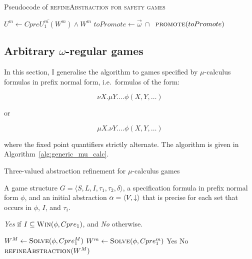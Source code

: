 \begin{algorithm}

\caption{Pseudocode of \textsc{refineAbstraction for safety games}}
\label{alg:refineAbstractionSafe}

\begin{algorithmic}[1]
\State $U^m \gets \overline{CpreU_1^{m}(W^m)} \land W^m$
    \State $toPromote \gets \vec{\omega}~\cap~$
    \State $\Call{promote}{toPromote}$
\EndFunction
\end{algorithmic}
\end{algorithm}

\subsection{Arbitrary $\omega$-regular games}
\label{sec:omega_reg}

In this section, I generalise the algorithm to games specified by $\mu$-calculus formulas in prefix normal form, i.e.\ formulas of the form:

\begin{equation}
\nu X. \mu Y. \ldots \phi(X, Y, \ldots)
\end{equation}

or

\begin{equation}
\mu X. \nu Y. \ldots \phi(X, Y, \ldots)
\end{equation}

\noindent where the fixed point quantifiers strictly alternate. The algorithm is given in Algorithm~\ref{alg:generic_mu_calc}.

\begin{algorithm}
\caption{Three-valued abstraction refinement for $\mu$-calculus games}
\label{alg:generic_mu_calc}

\begin{algorithmic}[1]

 A game structure $G = \langle S, L, I, \tau_1, \tau_2, \delta \rangle$, a specification formula in prefix normal form $\phi$, and an initial abstraction $\alpha=\langle V, \mathord{\downarrow} \rangle$ that is precise for each set that occurs in $\phi$, $I$, and $\tau_i$.

 {\it Yes} if $I \subseteq \textsc{Win}(\phi, Cpre_1)$, and {\it No} otherwise.

    \Loop
    \State $W^M \gets \textsc{Solve}(\phi, Cpre_1^M)$ \label{a:tvmc:sM}
    \State $W^m \gets \textsc{Solve}(\phi, Cpre_1^m)$ \label{a:tvmc:sm}
            \State\Return Yes \label{a:tvmc:Y}
            \State\Return No \label{a:tvmc:N}
        \Else       
            \State$\Call{refineAbstraction}{W^M}$
        \EndIf
    \EndLoop
\EndFunction

\end{algorithmic}
\end{algorithm}

